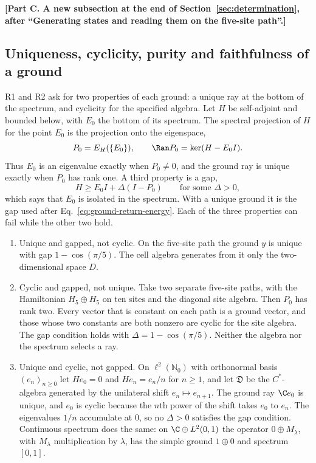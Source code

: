 \par\medskip\noindent\textbf{[Part C. A new subsection at the end of Section~\ref{sec:determination}, after ``Generating states and reading them on the five-site path''.]}\par\smallskip

\subsection{Uniqueness, cyclicity, purity and faithfulness of a ground}
\label{subsec:ground-properties}

R1 and R2 ask for two properties of each ground: a unique ray at the bottom of the spectrum, and cyclicity for the specified algebra. Let $H$ be self-adjoint and bounded below, with $E_0$ the bottom of its spectrum. The spectral projection of $H$ for the point $E_0$ is the projection onto the eigenspace,
\begin{equation}
 P_0=E_H(\{E_0\}),\qquad \Ran P_0=\ker(H-E_0I) .
 \label{eq:ground-spectral-projection}
\end{equation}
Thus $E_0$ is an eigenvalue exactly when $P_0\ne0$, and the ground ray is unique exactly when $P_0$ has rank one. A third property is a gap,
\begin{equation}
 H\geq E_0I+\Delta(I-P_0)\qquad\text{for some }\Delta>0 ,
 \label{eq:ground-gap-condition}
\end{equation}
which says that $E_0$ is isolated in the spectrum. With a unique ground it is the gap used after Eq.~\eqref{eq:ground-return-energy}. Each of the three properties can fail while the other two hold.
\begin{enumerate}
\item[(a)] Unique and gapped, not cyclic. On the five-site path the ground $y$ is unique with gap $1-\cos(\pi/5)$. The cell algebra generates from it only the two-dimensional space $D$.
\item[(b)] Cyclic and gapped, not unique. Take two separate five-site paths, with the Hamiltonian $H_5\oplus H_5$ on ten sites and the diagonal site algebra. Then $P_0$ has rank two. Every vector that is constant on each path is a ground vector, and those whose two constants are both nonzero are cyclic for the site algebra. The gap condition holds with $\Delta=1-\cos(\pi/5)$. Neither the algebra nor the spectrum selects a ray.
\item[(c)] Unique and cyclic, not gapped. On $\ell^2(\mathbb N_0)$ with orthonormal basis $(e_n)_{n\geq0}$ let $He_0=0$ and $He_n=e_n/n$ for $n\geq1$, and let $\mathfrak D$ be the $C^*$-algebra generated by the unilateral shift $e_n\mapsto e_{n+1}$. The ground ray $\C e_0$ is unique, and $e_0$ is cyclic because the $n$th power of the shift takes $e_0$ to $e_n$. The eigenvalues $1/n$ accumulate at $0$, so no $\Delta>0$ satisfies the gap condition. Continuous spectrum does the same: on $\C\oplus L^2(0,1)$ the operator $0\oplus M_\lambda$, with $M_\lambda$ multiplication by $\lambda$, has the simple ground $1\oplus0$ and spectrum $[0,1]$.
\end{enumerate}
